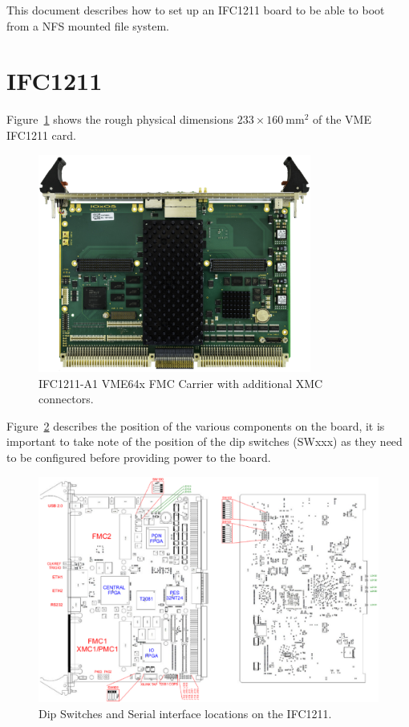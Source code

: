 \documentclass[11pt
  , a4paper
  , article
  , oneside
  , showtrims
]{memoir}
\begin{document}
This document describes how to set up an IFC1211 board to be able to boot from a NFS mounted file system.

\section{IFC1211}
Figure~\ref{fig:ifc1211_dim} shows the rough physical dimensions $233\times 160~\mathrm{mm}{}^2$ of the VME IFC1211 card.

\begin{figure}[!htb]
  \centering
  \includegraphics[width=0.80\textwidth]{./pictures/IOxOS_IFC1211.eps}
  \caption{
    IFC1211-A1 VME64x FMC Carrier with additional XMC connectors.
  }
  \label{fig:ifc1211_dim}   
\end{figure}

Figure~\ref{fig:ser_ifc_con} describes the position of the various components on the board, it is important to take note of the position of the dip switches (SWxxx) as they need to be configured before providing power to the board.

\begin{figure}[!htb]
	\centering
	\hspace*{-2.5cm}
	\includegraphics[width=1.4\textwidth]{./pictures/ser_ifc_con.eps}
	\caption{
		Dip Switches and Serial interface locations on the IFC1211.
	}
	\label{fig:ser_ifc_con}
\end{figure}
\end{document}
